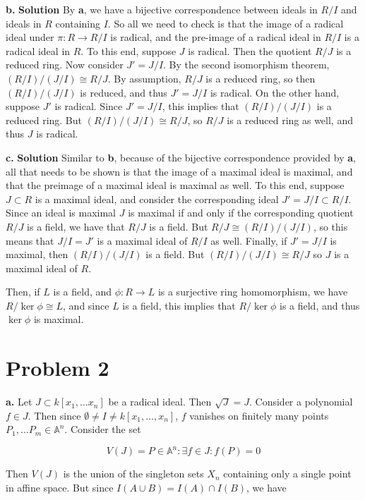 \documentclass{article}
\begin{document}
\textbf{b. } \textbf{Solution } By \textbf{a}, we have a bijective correspondence between ideals in $R / I$ and ideals in $R$ containing $I$. So all we need to check is that the image of a radical ideal 
under $\pi : R \to R / I$ is radical, and the pre-image of a radical ideal in $R / I$ is a radical ideal in $R$. To this end, suppose $J$ is radical. Then the quotient $R / J$ is a reduced ring. Now consider $J' = J / I$. By the second isomorphism theorem,
$ (R / I) / (J / I) \cong R / J$. By assumption, $R / J$ is a reduced ring, so then $(R / I) / (J / I)$ is reduced, and thus $J' = J / I$ is radical. On the other hand, suppose $J'$ is radical. Since $J' = J/I$, this implies
that $(R/I)/(J/I)$ is a reduced ring. But $ (R / I) / (J / I) \cong R / J$, so $R / J$ is a reduced ring as well, and thus $J$ is radical. 

\textbf{c. } \textbf{Solution } Similar to \textbf{b}, because of the bijective correspondence provided by \textbf{a}, all that needs to be shown is that the image of a maximal ideal is maximal, and that 
the preimage of a maximal ideal is maximal as well. To this end, suppose $J \subset R$ is a maximal ideal, and consider the corresponding ideal $J' = J/I \subset R/I$. Since an ideal is maximal $J$ is maximal
if and only if the corresponding quotient $R/J$ is a field, we have that $R/J$ is a field. But $R/J \cong (R/I)/(J/I)$, so this means that $J/I = J'$ is a maximal ideal of $R/I$ as well. Finally, if 
$J' = J/I$ is maximal, then $(R/I)/(J/I)$ is a field. But $(R/I)/(J/I) \cong R/J$ so $J$ is a maximal ideal of $R$. 

Then, if $L$ is a field, and $\phi: R \to L$ is a surjective ring homomorphism, we have $R / \ker\phi \cong L$, and since $L$ is a field, this implies that $R / \ker\phi$ is a field, and thus $\ker\phi$ is maximal. 




\section{Problem 2}
\textbf{a. } Let $J \subset k[x_1, \ldots x_n]$ be a radical ideal. Then $\sqrt{J} = J$. Consider a polynomial $f \in J$. Then since $\emptyset \neq I \neq k[x_1, \ldots, x_n]$,
$f$ vanishes on finitely many points $P_1, \ldots P_m \in \mathbb{A}^n$. Consider the set

\[ V(J)  = {P\in \mathbb{A}^n : \exists f \in J : f(P) = 0} \]

Then $V(J)$ is the union of the singleton sets $X_n$ containing only a single point in affine space. But since $I(A \cup B) = I(A) \cap I(B)$, we have
\end{document}
